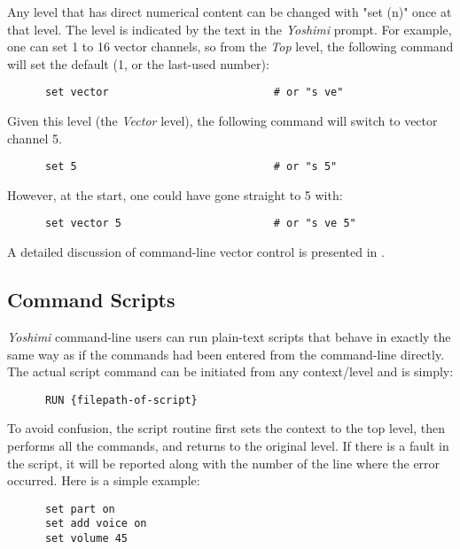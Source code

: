    Any level that has direct numerical content can be changed with
   "set (n)" once at that level.  The level is
   indicated by the text in the \textsl{Yoshimi} prompt.
   For example, one can set 1 to 16 vector channels, so from the
   \textsl{Top} level, the following command
   will set the default  (1, or the last-used number):

   \begin{verbatim}
      set vector                          # or "s ve"
   \end{verbatim}

   Given this level (the \textsl{Vector} level), the following command
   will switch to vector channel 5.

   \begin{verbatim}
      set 5                               # or "s 5"
   \end{verbatim}

   However, at the start, one could have gone straight to 5 with:

   \begin{verbatim}
      set vector 5                        # or "s ve 5"
   \end{verbatim}

   A detailed discussion of command-line vector control is presented in
   .

\subsection{Command Scripts}
\label{subsec:command_line_command_scripts}

   \textsl{Yoshimi} command-line users can run plain-text scripts that behave
   in exactly the same way as if the commands had been entered from the
   command-line directly.
   The actual script command can be initiated from any context/level
   and is simply:

   \begin{verbatim}
      RUN {filepath-of-script}
   \end{verbatim}

   To avoid confusion, the script routine first sets the context to the
   top level, then performs all the commands, and returns to the original
   level. If there is a fault in the script, it will be reported along with the
   number of the line where the error occurred.
   Here is a simple example:

   \begin{verbatim}
      set part on
      set add voice on
      set volume 45
   \end{verbatim}


